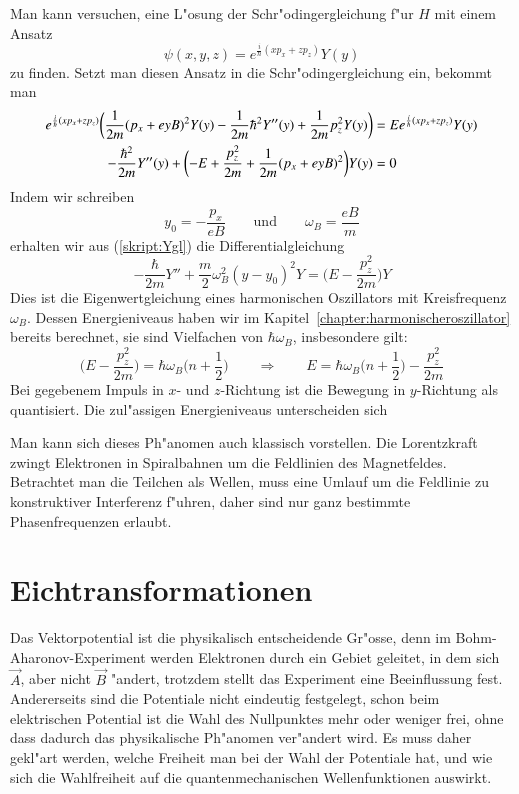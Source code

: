 Man kann versuchen, eine L"osung der Schr"odingergleichung f"ur $H$ mit
einem Ansatz
\[
\psi(x,y,z)
=
e^{\frac{i}{\hbar}(xp_x+zp_z)}Y(y)
\]
zu finden.
Setzt man diesen Ansatz in die Schr"odingergleichung ein, bekommt man
\begin{align}
e^{\frac{i}{\hbar}(xp_x+zp_z)}
\biggl(
\frac1{2m}
(p_x+eyB)^2
Y(y)
-
\frac1{2m}
\hbar^2 Y''(y)
+
\frac1{2m}p_z^2
Y(y)
\biggr)
&=
E
e^{\frac{i}{\hbar}(xp_x+zp_z)}
Y(y)
\notag
\\
-\frac{\hbar^2}{2m} Y''(y)
+
\biggl(
-E
+
\frac{ p_z^2}{2m}
+
\frac1{2m}
(p_x+eyB)^2
\biggr)
Y(y)
&=
0
\label{skript:Ygl}
\end{align}
Indem wir schreiben
\[
y_0=-\frac{p_x}{eB}
\qquad
\text{und}
\qquad
\omega_B
=\frac{eB}{m}
\]
erhalten wir aus (\ref{skript:Ygl}) die Differentialgleichung
\begin{equation}
-\frac{\hbar}{2m}Y''
+\frac{m}2\omega_B^2(y-y_0)^2Y
=
\biggl(E-\frac{p_z^2}{2m}\biggr) Y
\label{skript:landauniveaus}
\end{equation}
Dies ist die Eigenwertgleichung eines harmonischen Oszillators mit
Kreisfrequenz $\omega_B$.
Dessen Energieniveaus haben wir im Kapitel~\ref{chapter:harmonischeroszillator}
bereits berechnet, sie sind Vielfachen von $\hbar\omega_B$, insbesondere
gilt:
\[
\biggl(E-\frac{p_z^2}{2m}\biggr) = \hbar\omega_B\biggl(n+\frac12\biggr)
\qquad\Rightarrow\qquad
E=
\hbar\omega_B\biggl(n+\frac12\biggr)
-
\frac{p_z^2}{2m}
\]
Bei gegebenem Impuls in $x$- und $z$-Richtung ist die Bewegung in
$y$-Richtung als quantisiert.
Die zul"assigen Energieniveaus unterscheiden sich 

Man kann sich dieses Ph"anomen auch klassisch vorstellen.
Die Lorentzkraft zwingt Elektronen in Spiralbahnen um die Feldlinien des
Magnetfeldes.
Betrachtet man die Teilchen als Wellen, muss eine Umlauf um die
Feldlinie zu konstruktiver Interferenz f"uhren, daher sind nur
ganz bestimmte Phasenfrequenzen erlaubt.

%
%
\section{Eichtransformationen\label{section:eichtransformation}}
Das Vektorpotential ist die physikalisch entscheidende Gr"osse,
denn im Bohm-Aharonov-Experiment
werden Elektronen durch ein Gebiet geleitet, in dem sich $\vec A$,
aber nicht $\vec B$ "andert, trotzdem stellt das Experiment eine
Beeinflussung fest.
Andererseits sind die Potentiale nicht eindeutig festgelegt, schon
beim elektrischen Potential ist die Wahl des Nullpunktes mehr oder
weniger frei, ohne dass dadurch das physikalische Ph"anomen ver"andert
wird.
Es muss daher gekl"art werden, welche Freiheit man bei der Wahl
der Potentiale hat, und wie sich die Wahlfreiheit auf die quantenmechanischen
Wellenfunktionen auswirkt.

